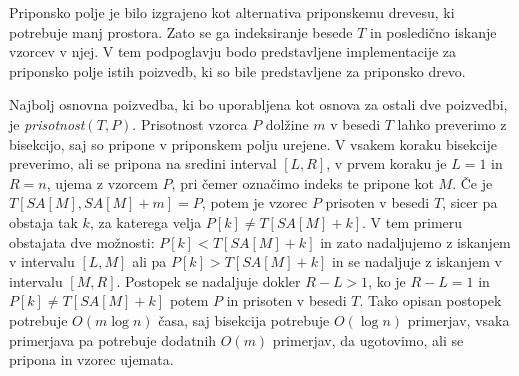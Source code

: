 Priponsko polje je bilo izgrajeno kot alternativa priponskemu drevesu, ki potrebuje manj prostora. Zato se ga indeksiranje besede $T$ in posledično iskanje vzorcev v njej. V tem podpoglavju bodo predstavljene implementacije za priponsko polje istih poizvedb, ki so bile predstavljene za priponsko drevo.

Najbolj osnovna poizvedba, ki bo uporabljena kot osnova za ostali dve poizvedbi, je \textit{prisotnost}$(T,P)$. Prisotnost vzorca $P$ dolžine $m$ v besedi $T$ lahko preverimo z bisekcijo, saj so pripone v priponskem polju urejene. V vsakem koraku bisekcije preverimo, ali se pripona na sredini interval $[L,R]$, v prvem koraku je $L=1$ in $R=n$, ujema z vzorcem $P$, pri čemer označimo indeks te pripone kot $M$. Če je $T[SA[M],SA[M]+m]=P$, potem je vzorec $P$ prisoten v besedi $T$, sicer pa obstaja tak $k$, za katerega velja $P[k]\ne T[SA[M]+k]$. V tem primeru obstajata dve možnosti: $P[k]<T[SA[M]+k]$ in zato nadaljujemo z iskanjem v intervalu $[L,M]$ ali pa $P[k]>T[SA[M]+k]$ in se nadaljuje z iskanjem v intervalu $[M,R]$. Postopek se nadaljuje dokler $R-L>1$, ko je $R-L=1$ in $P[k]\ne T[SA[M]+k]$ potem $P$ in prisoten v besedi $T$. Tako opisan postopek potrebuje $O(m\log{n})$ časa, saj bisekcija potrebuje $O(\log{n})$ primerjav, vsaka primerjava pa potrebuje dodatnih $O(m)$ primerjav, da ugotovimo, ali se pripona in vzorec ujemata.

